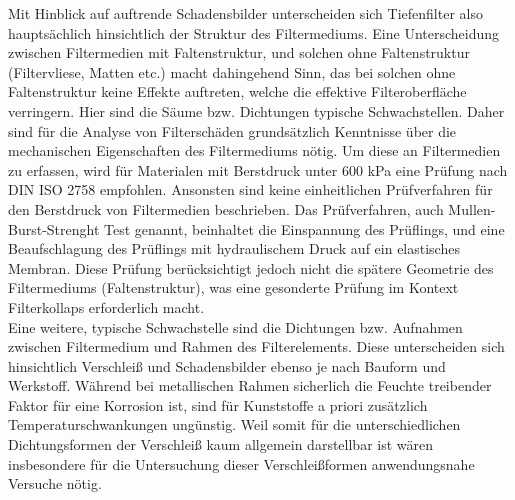     Mit Hinblick auf auftrende Schadensbilder unterscheiden sich Tiefenfilter also hauptsächlich hinsichtlich der Struktur des Filtermediums. Eine Unterscheidung zwischen Filtermedien mit Faltenstruktur, und solchen ohne Faltenstruktur (Filtervliese, Matten etc.) macht dahingehend Sinn, das bei solchen ohne Faltenstruktur keine Effekte auftreten, welche die effektive Filteroberfläche verringern. Hier sind die Säume bzw. Dichtungen typische Schwachstellen. Daher sind für die Analyse von Filterschäden grundsätzlich Kenntnisse über die mechanischen Eigenschaften des Filtermediums nötig. Um diese an Filtermedien zu erfassen, wird für Materialen mit Berstdruck unter 600 kPa  eine Prüfung nach DIN ISO 2758\cite{2758} empfohlen. Ansonsten sind keine einheitlichen Prüfverfahren für den Berstdruck von Filtermedien beschrieben. Das Prüfverfahren, auch Mullen-Burst-Strenght Test genannt, beinhaltet die Einspannung des Prüflings, und eine Beaufschlagung des Prüflings mit hydraulischem Druck auf ein elastisches Membran. Diese Prüfung berücksichtigt jedoch nicht die spätere Geometrie des Filtermediums (Faltenstruktur), was eine gesonderte Prüfung im Kontext Filterkollaps erforderlich macht. \\
    Eine weitere, typische Schwachstelle sind die Dichtungen bzw. Aufnahmen zwischen Filtermedium und Rahmen des Filterelements. Diese unterscheiden sich hinsichtlich Verschleiß und Schadensbilder ebenso je nach Bauform und Werkstoff. Während bei metallischen Rahmen sicherlich die Feuchte treibender Faktor für eine Korrosion ist, sind für Kunststoffe a priori zusätzlich Temperaturschwankungen ungünstig. Weil somit für die unterschiedlichen Dichtungsformen der Verschleiß kaum allgemein darstellbar ist wären insbesondere für die Untersuchung dieser Verschleißformen anwendungsnahe Versuche nötig.
